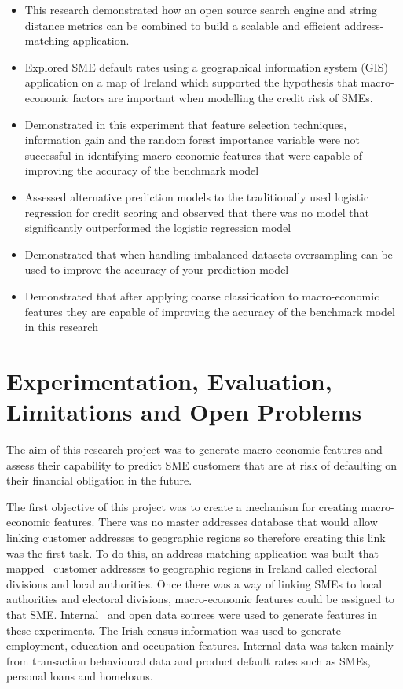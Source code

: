 \begin{itemize}
	\item This research demonstrated how an open source search engine and string distance metrics can be combined to build a scalable and efficient address-matching application.
	
	\item Explored SME default rates using a geographical information system (GIS) application on a map of Ireland which supported the hypothesis that macro-economic factors are important when modelling the credit risk of SMEs.
	
	\item Demonstrated in this experiment that feature selection techniques, information gain and the random forest importance variable were not successful in identifying macro-economic features that were capable of improving the accuracy of the benchmark model   
	
	\item Assessed alternative prediction models to the traditionally used logistic regression for credit scoring and observed that there was no model that significantly outperformed the logistic regression model
	
	\item Demonstrated that when handling imbalanced datasets oversampling can be used to improve the accuracy of your prediction model
	
	\item Demonstrated that after applying coarse classification to macro-economic features they are capable of improving the accuracy of the benchmark model in this research
\end{itemize}

\section{Experimentation, Evaluation, Limitations and Open Problems}
The aim of this research project was to generate macro-economic features and assess their capability to predict SME customers that are at risk of defaulting on their financial obligation in the future. 

The first objective of this project was to create a mechanism for creating macro-economic features. There was no master addresses database that would allow linking customer addresses to geographic regions so therefore creating this link was the first task. To do this, an address-matching application was built that mapped \subjectname\ customer addresses to geographic regions in Ireland called electoral divisions and local authorities. Once there was a way of linking SMEs to local authorities and electoral divisions, macro-economic features could be assigned to that SME. Internal \subjectname\ and open data sources were used to generate features in these experiments. The Irish census information was used to generate employment, education and occupation features. Internal data was taken mainly from transaction behavioural data and product default rates such as SMEs, personal loans and homeloans.  

